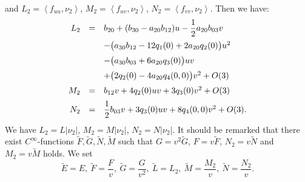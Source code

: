 \documentclass[a4paper, 12pt]{article}
\theoremstyle{definition}
\numberwithin{equation}{section}
\begin{document}
and 
$L_2={\left\langle{{f_{uu}}},{{\nu_2}}\right\rangle}$, 
$M_2={\left\langle{{f_{uv}}},{{\nu_2}}\right\rangle}$, 
$N_2={\left\langle{{f_{vv}}},{{\nu_2}}\right\rangle}$.
Then we have:
\begin{equation} \label{coeff:2ff}
\begin{array}{rcl}
L_2
&=&
b_{20}+ (b_{30}- a_{20} b_{12}) u -\dfrac{1}{2}a_{20} b_{03} v\\[3mm]
&&\hspace{0mm}
-\big(a_{30} b_{12}-12 q_1(0)+2 a_{20} q_2(0)\big) u^2\\[2mm]
&& \hspace{0mm}
-\big(a_{30} b_{03}+6 a_{20} q_3(0)\big)u v\\[2mm]
&& \hspace{0mm}
+ \big(2 q_2(0)-4 a_{20} q_4(0,0)\big) v^2
+ O(3) \\[2mm]
M_2
&=&
b_{12} v+4  q_2(0) u v + 3 q_3(0) v^2 + O(3)\\[2mm]
N_2
&=&
\dfrac{1}{2}b_{03} v+3 q_3(0)uv+ 8 q_4(0,0) v^2 + O(3).
\end{array}
\end{equation}
We have $L_2=L|\nu_2|$, $M_2=M|\nu_2|$, $N_2=N|\nu_2|$.
It should be remarked that
there exist $C^\infty$-functions
$\widetilde F,\widetilde G,\widetilde N,\widetilde M$
such that
$
G=v^2 \widetilde G$,
$F=v \widetilde F$,
$N_2=v \widetilde N$ and
$M_2=v \widetilde M$
holds. We set 
\begin{equation}\label{eq:fundform}
\widetilde E=E,\ 
\widetilde F=\dfrac{F}{v},\ 
\widetilde G=\dfrac{G}{v^2},\ 
\widetilde L=L_2,\ 
\widetilde M=\dfrac{M_2}{v},\ 
\widetilde N=\dfrac{N_2}{v}.
\end{equation}
\end{document}
